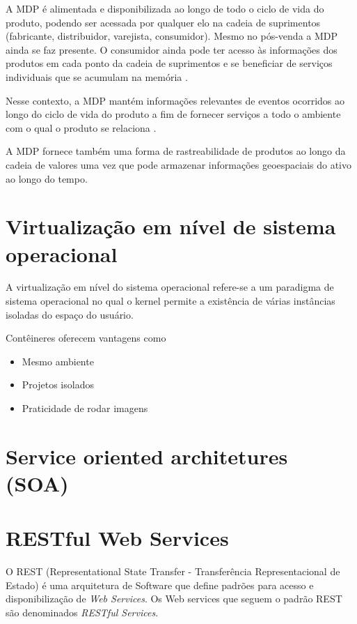 \documentclass[
	12pt,				%
	oneside,			%
	a4paper,			%
	english,			%
	brazil				%
]{abntex2}
\begin{document}
	A MDP é alimentada e disponibilizada ao longo de todo o ciclo de vida do produto, podendo ser acessada por qualquer elo na cadeia de suprimentos (fabricante, distribuidor, varejista, consumidor). Mesmo no pós-venda a MDP ainda se faz presente. O consumidor ainda pode ter acesso às informações dos produtos em cada ponto da cadeia de suprimentos e se beneficiar de serviços individuais que se acumulam na memória \cite{brandherm2011productmemory}.

	Nesse contexto, a MDP mantém informações relevantes de eventos ocorridos ao longo do ciclo de vida do produto a fim de fornecer serviços a todo o ambiente com o qual o produto se relaciona \cite{brandherm2011productmemory}.
	
	A MDP fornece também uma forma de rastreabilidade de produtos ao longo da cadeia de valores uma vez que pode armazenar informações geoespaciais do ativo ao longo do tempo.

	\section{Virtualização em nível de sistema operacional}
	
	A virtualização em nível do sistema operacional refere-se a um paradigma de sistema operacional no qual o kernel permite a existência de várias instâncias isoladas do espaço do usuário.

	Contêineres oferecem vantagens como
	
	\begin{itemize}
		\item Mesmo ambiente
		\item Projetos isolados
		\item Praticidade de rodar imagens
	\end{itemize}

	\section{Service oriented architetures (SOA)}
	
	\lipsum[1-1]
	
	\section{RESTful Web Services}
	
	O REST (Representational State Transfer - Transferência Representacional de Estado) é uma arquitetura de Software que define padrões para acesso e disponibilização de \textit{Web Services}. Os Web services que seguem o padrão REST são denominados \textit{RESTful Services}.
	
\end{document}
